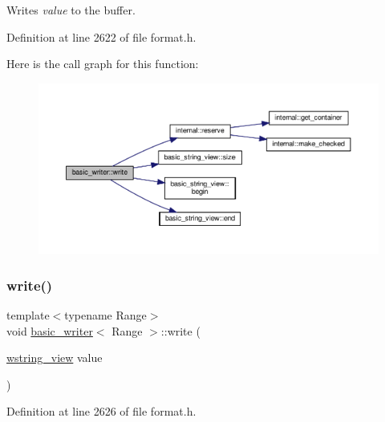 Writes {\itshape value} to the buffer.  

Definition at line 2622 of file format.\+h.

Here is the call graph for this function\+:
\nopagebreak
\begin{figure}[H]
\begin{center}
\leavevmode
\includegraphics[width=350pt]{classbasic__writer_a9145dbe901036b8f1a35587faac5e74e_cgraph}
\end{center}
\end{figure}
\mbox{\label{classbasic__writer_ac6bb2fa0a1325a20d4288b66378fb4dd}} 
\subsubsection{\texorpdfstring{write()}{write()}\hspace{0.1cm}{\footnotesize\ttfamily [13/16]}}
{\footnotesize\ttfamily template$<$typename Range$>$ \\
void \hyperlink{classbasic__writer}{basic\+\_\+writer}$<$ Range $>$\+::write (\begin{DoxyParamCaption}\item[{\hyperlink{core_8h_ad7c259380697a46ef799332f3ded429e}{wstring\+\_\+view}}]{value }\end{DoxyParamCaption})\hspace{0.3cm}{\ttfamily [inline]}}



Definition at line 2626 of file format.\+h.

